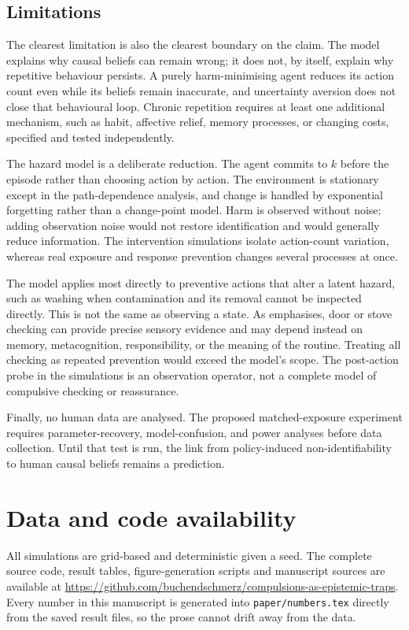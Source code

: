 \documentclass[11pt]{article}
\begin{document}
\subsection{Limitations}

The clearest limitation is also the clearest boundary on the claim. The model
explains why causal beliefs can remain wrong; it does not, by itself, explain why
repetitive behaviour persists. A purely harm-minimising agent reduces its action
count even while its beliefs remain inaccurate, and uncertainty aversion does not
close that behavioural loop. Chronic repetition requires at least one additional
mechanism, such as habit, affective relief, memory processes, or changing costs,
specified and tested independently.

The hazard model is a deliberate reduction. The agent commits to $k$ before the
episode rather than choosing action by action. The environment is stationary
except in the path-dependence analysis, and change is handled by exponential
forgetting rather than a change-point model. Harm is observed without noise;
adding observation noise would not restore identification and would generally
reduce information. The intervention simulations isolate action-count variation,
whereas real exposure and response prevention changes several processes at once.

The model applies most directly to preventive actions that alter a latent hazard,
such as washing when contamination and its removal cannot be inspected directly.
This is not the same as observing a state. As \citet{prudon2021} emphasises, door
or stove checking can provide precise sensory evidence and may depend instead on
memory, metacognition, responsibility, or the meaning of the routine. Treating
all checking as repeated prevention would exceed the model's scope. The
post-action probe in the simulations is an observation operator, not a complete
model of compulsive checking or reassurance.

Finally, no human data are analysed. The proposed matched-exposure experiment
requires parameter-recovery, model-confusion, and power analyses before data
collection. Until that test is run, the link from policy-induced
non-identifiability to human causal beliefs remains a prediction.

\section*{Data and code availability}

All simulations are grid-based and deterministic given a seed. The complete
source code, result tables, figure-generation scripts and manuscript sources are
available at
\url{https://github.com/buchendschmerz/compulsions-as-epistemic-traps}.
Every number in this
manuscript is generated into \texttt{paper/numbers.tex} directly from the saved
result files, so the prose cannot drift away from the data.


\end{document}
